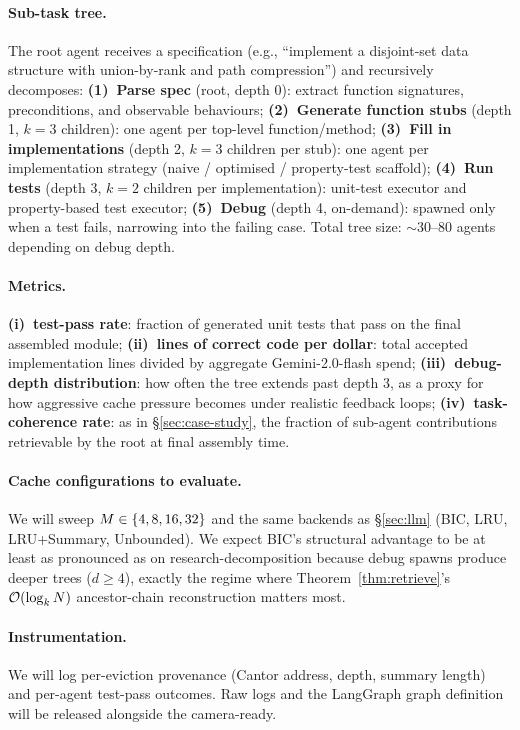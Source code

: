 \paragraph{Sub-task tree.}
The root agent receives a specification (e.g., ``implement a
disjoint-set data structure with union-by-rank and path
compression'') and recursively decomposes:
\textbf{(1)~Parse spec} (root, depth 0): extract function signatures,
preconditions, and observable behaviours;
\textbf{(2)~Generate function stubs} (depth 1, $k=3$ children): one
agent per top-level function/method;
\textbf{(3)~Fill in implementations} (depth 2, $k=3$ children per
stub): one agent per implementation strategy
(naive / optimised / property-test scaffold);
\textbf{(4)~Run tests} (depth 3, $k=2$ children per implementation):
unit-test executor and property-based test executor;
\textbf{(5)~Debug} (depth 4, on-demand): spawned only when a test fails,
narrowing into the failing case.
Total tree size: $\sim$30--80 agents depending on debug depth.

\paragraph{Metrics.}
\textbf{(i)~test-pass rate}: fraction of generated unit tests that
pass on the final assembled module;
\textbf{(ii)~lines of correct code per dollar}: total accepted
implementation lines divided by aggregate Gemini-2.0-flash spend;
\textbf{(iii)~debug-depth distribution}: how often the tree extends
past depth 3, as a proxy for how aggressive cache pressure becomes
under realistic feedback loops;
\textbf{(iv)~task-coherence rate}: as in \S\ref{sec:case-study},
the fraction of sub-agent contributions retrievable by the root at
final assembly time.

\paragraph{Cache configurations to evaluate.}
We will sweep $M \in \{4, 8, 16, 32\}$ and the same backends
as \S\ref{sec:llm} (BIC, LRU, LRU+Summary, Unbounded).  We expect
BIC's structural advantage to be at least as pronounced as on
research-decomposition because debug spawns produce deeper trees
($d \geq 4$), exactly the regime where Theorem~\ref{thm:retrieve}'s
$\mathcal{O}(\log_k N)$ ancestor-chain reconstruction matters most.

\paragraph{Instrumentation.}
We will log per-eviction provenance (Cantor address, depth, summary
length) and per-agent test-pass outcomes.  Raw logs and the LangGraph
graph definition will be released alongside the camera-ready.


